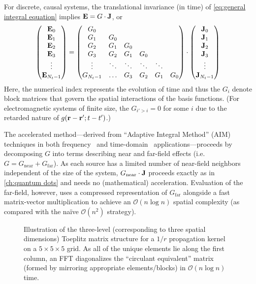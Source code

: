 For discrete, causal systems, the translational invariance (in time) of \cref{eq:general integral equation} implies $\vb{E} = G \cdot \vb{J}$, or
\begin{equation}
  \mqty(\vb{E}_0 \\ \vb{E}_1 \\ \vb{E}_2 \\ \vb{E}_3 \\ \vdots \\ \vb{E}_{N_t - 1}) = 
  \mqty(G_0 \\ G_1 & G_0 \\ G_2 & G_1 & G_0 \\ G_3 & G_2 & G_1 & G_0 \\ \vdots & \ddots & \ddots  & \ddots & \ddots \\ G_{N_t - 1} & \dots & G_3 & G_2 & G_1 & G_0) \cdot
  \mqty(\vb{J}_0 \\ \vb{J}_1 \\ \vb{J}_2 \\ \vb{J}_3 \\ \vdots \\ \vb{J}_{N_t - 1})
  \label{eq:matrix system}
\end{equation}
Here, the numerical index represents the evolution of time and thus the $G_i$ denote block matrices that govern the spatial interactions of the basis functions.
(For electromagnetic systems of finite size, the $G_{i' > i} = 0$ for some $i$ due to the retarded nature of $g(\vb{r} - \vb{r}'; t - t')$.)

The accelerated method---derived from ``Adaptive Integral Method'' (AIM) techniques in both frequency~\cite{Bleszynski1996} and time-domain~\cite{Yilmaz2004} applications---proceeds by decomposing $G$ into terms describing near and far-field effects (i.e. $G = G_\text{near} + G_\text{far}$).
As each source has a limited number of near-field neighbors independent of the size of the system, $G_\text{near} \cdot \vb{J}$ proceeds exactly as in \cref{ch:quantum dots} and needs no (mathematical) acceleration.
Evaluation of the far-field, however, uses a compressed representation of $G_\text{far}$ alongside a fast matrix-vector multiplication to achieve an $\mathcal{O}(n \log n)$ spatial complexity (as compared with the na\"ive $\mathcal{O}(n^2)$ strategy).

\begin{figure}
  \centering
  \caption{\label{fig:toeplitz}Illustration of the three-level (corresponding to three spatial dimensions) Toeplitz matrix structure for a $1/r$ propagation kernel on a $5 \times 5 \times 5$ grid.
  As all of the unique elements lie along the first column, an FFT diagonalizes the ``circulant equivalent'' matrix (formed by mirroring appropriate elements/blocks) in $\mathcal{O}(n \log n)$ time.}
\end{figure}
